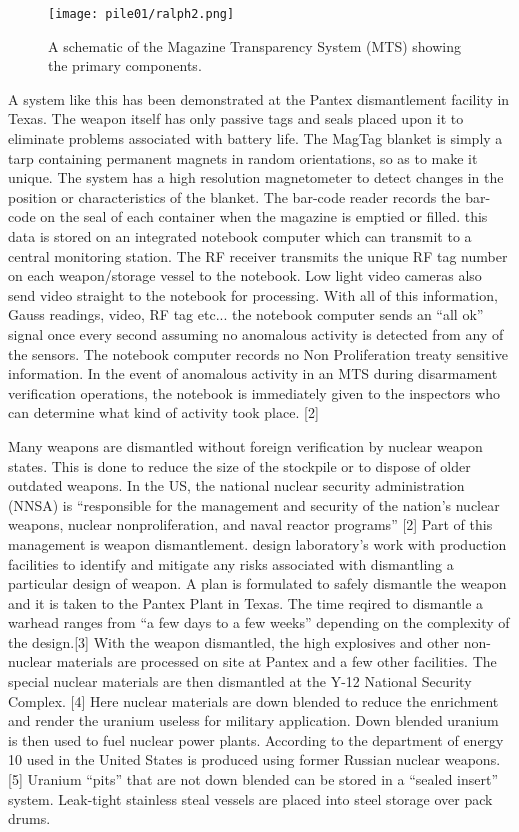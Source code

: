 \documentclass[a4paper]{article}
\begin{document}
\begin{figure}[h!]
  \texttt{[image: pile01/ralph2.png]}
  \caption{A schematic of the Magazine Transparency System (MTS) showing the primary components.}
\end{figure}

A system like this has been demonstrated at the Pantex dismantlement facility in 
Texas. The weapon itself has only passive tags and seals placed upon it to eliminate 
problems associated with battery life. The MagTag blanket is simply a tarp containing 
permanent magnets in random orientations, so as to make it unique. The system has a 
high resolution magnetometer to detect changes in the position or characteristics of 
the blanket. The bar-code reader records the bar-code on the seal of each container 
when the magazine is emptied or filled. this data is stored on an integrated notebook 
computer which can transmit to a central monitoring station. The RF receiver transmits 
the unique RF tag number on each weapon/storage vessel to the notebook. Low light video 
cameras also send video straight to the notebook for processing. With all of this 
information, Gauss readings, video, RF tag etc... the notebook computer sends an ``all 
ok'' signal once every second assuming no anomalous activity is detected from any of the 
sensors. The notebook computer records no Non Proliferation treaty sensitive information. 
In the event of anomalous activity in an MTS during disarmament verification operations, 
the notebook is immediately given to the inspectors who can determine what kind of 
activity took place. [2]

Many weapons are dismantled without foreign verification by nuclear weapon states. 
This is done to reduce the size of the stockpile or to dispose of older outdated weapons. 
In the US, the national nuclear security administration (NNSA) is ``responsible for the 
management and security of the nation’s nuclear weapons, nuclear nonproliferation, and 
naval reactor programs'' [2] Part of this management is weapon dismantlement. design 
laboratory's work with production facilities to identify and mitigate any risks 
associated with dismantling a particular design of weapon. A plan is formulated to 
safely dismantle the weapon and it is taken to the Pantex Plant in Texas. The time 
reqired to dismantle a warhead ranges from ``a few days to a few weeks'' depending on 
the complexity of the design.[3] With the weapon dismantled, the high explosives and 
other non-nuclear materials are processed on site at Pantex and a few other facilities. 
The special nuclear materials are then dismantled at the Y-12 National Security Complex. 
[4] Here nuclear materials are down blended to reduce the enrichment and render the 
uranium useless for military application. Down blended uranium is then used to fuel 
nuclear power plants. According to the department of energy 10%
used in the United States is produced using former Russian nuclear weapons.[5] Uranium 
``pits'' that are not down blended can be stored in a ``sealed insert'' system. Leak-tight 
stainless steal vessels are placed into steel storage over pack drums.
\end{document}
